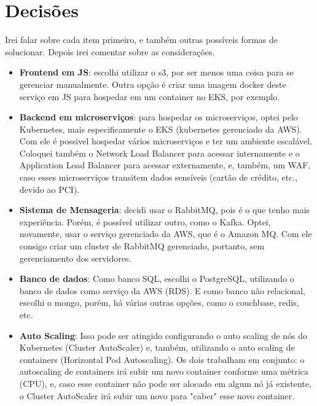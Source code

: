 \documentclass{article}
\begin{document}
    \section{Decisões}
        Irei falar sobre cada item primeiro, e também outras possíveis formas de solucionar.
        Depois irei comentar sobre as considerações.
        \begin{itemize}
            \item \textbf{Frontend em JS}: escolhi utilizar o s3, por ser menos uma coisa para se gerenciar manualmente. Outra opção é criar uma imagem docker deste serviço em JS para hospedar em um container no EKS, por exemplo.
            \item \textbf{Backend em microserviços}: para hospedar os microserviços, optei pelo Kubernetes, mais especificamente o EKS (kubernetes gerenciado da AWS). Com ele é possivel hospedar vários microserviços e ter um ambiente escalável. Coloquei também o Network Load Balancer para acessar internamente e o Application Load Balancer para acessar externamente, e, também, um WAF, caso esses microserviços transitem dados sensíveis (cartão de crédito, etc., devido ao PCI).
            \item \textbf{Sistema de Mensageria}: decidi usar o RabbitMQ, pois é o que tenho mais experiência. Porém, é possível utilizar outro, como o Kafka. Optei, novamente, usar o serviço gerenciado da AWS, que é o Amazon MQ. Com ele consigo criar um cluster de RabbitMQ gerenciado, portanto, sem gerenciamento dos servidores.
            \item \textbf{Banco de dados}: Como banco SQL, escolhi o PostgreSQL, utilizando o banco de dados como serviço da AWS (RDS). E como banco não relacional, escolhi o mongo, porém, há várias outras opções, como o couchbase, redis, etc.
            \item \textbf{Auto Scaling}: Isso pode ser atingido configurando o auto scaling de nós do Kubernetes (Cluster AutoScaler) e, também, utilizando o auto scaling de containers (Horizontal Pod Autoscaling). Os dois trabalham em conjunto: o autoscaling de containers irá subir um novo container conforme uma métrica (CPU), e, caso esse container não pode ser alocado em algum nó já existente, o Cluster AutoScaler irá subir um novo para "caber" esse novo container.
        \end{itemize}
\end{document}
